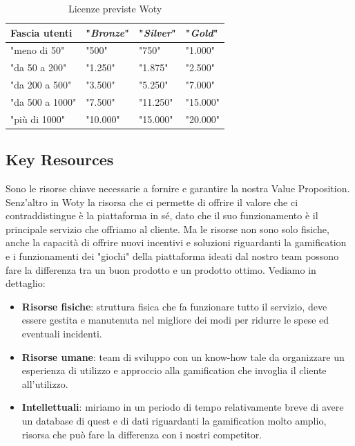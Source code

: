 \begin{table}[ht]

\caption{Licenze previste Woty}
\centering
\begin{tabular}{|p{3cm}|p{}|p{}|p{}|}
\hline
\rule[-2mm]{0mm}{0.7cm}
\textbf{Fascia utenti} &	"\textbf{\textit{Bronze}}" 	& 	"\textbf{\textit{Silver}}" 	& 	"\textbf{\textit{Gold}}"\\
\hline
\rule[-2mm]{0mm}{0.7cm}
"meno di 50"	    &			"500\EUR"	        & 			"750\EUR"			& 			"1.000\EUR"		\\
\hline
\rule[-2mm]{0mm}{0.7cm}
"da 50 a 200"	&			"1.250\EUR"			& 			"1.875\EUR"			& 			"2.500\EUR"		\\
\hline
\rule[-2mm]{0mm}{0.7cm}
"da 200 a 500"	&			"3.500\EUR"			& 			"5.250\EUR"			& 			"7.000\EUR"		\\
\hline
\rule[-2mm]{0mm}{0.7cm}
"da 500 a 1000"	&			"7.500\EUR"			& 			"11.250\EUR"			& 			"15.000\EUR"		\\
\hline
\rule[-2mm]{0mm}{0.7cm}
"più di 1000"	&			"10.000\EUR"			& 			"15.000\EUR"			& 			"20.000\EUR"		\\
\hline
\end{tabular}
\end{table}

\subsection{Key Resources}
Sono le risorse chiave necessarie a fornire e garantire la nostra Value Proposition. Senz'altro in Woty la risorsa che ci permette di offrire il valore che ci contraddistingue è la piattaforma in sé, dato che il suo funzionamento è il principale servizio che offriamo al cliente. Ma le risorse non sono solo fisiche, anche la capacità di offrire nuovi incentivi e soluzioni riguardanti la gamification e i funzionamenti dei "giochi" della piattaforma ideati dal nostro team possono fare la differenza tra un buon prodotto e un prodotto ottimo. Vediamo in dettaglio:
\begin{itemize}
\item \textbf{Risorse fisiche}: struttura fisica che fa funzionare tutto il servizio, deve essere gestita e manutenuta nel migliore dei modi per ridurre le spese ed eventuali incidenti.
\item \textbf{Risorse umane}: team di sviluppo con un know-how tale da organizzare un esperienza di utilizzo e approccio alla gamification che invoglia il cliente all'utilizzo.
\item \textbf{Intellettuali}: miriamo in un periodo di tempo relativamente breve di avere un database di quest e di dati riguardanti la gamification molto amplio, risorsa che può fare la differenza con i nostri competitor.
\end{itemize}

